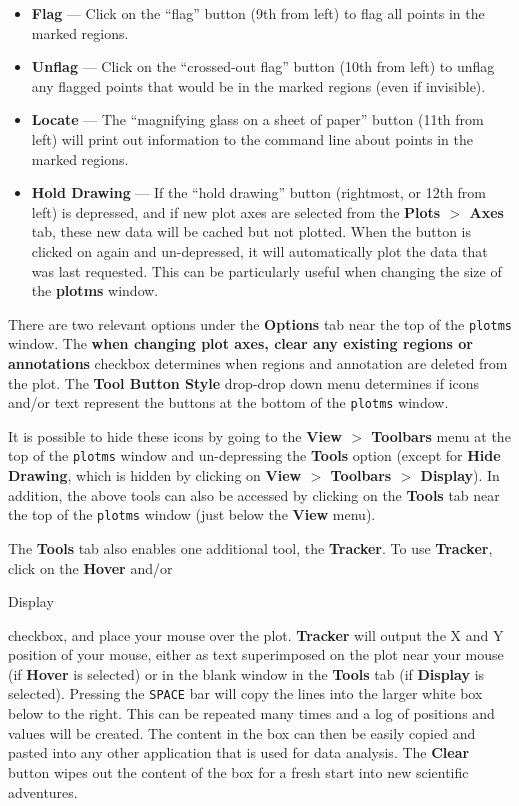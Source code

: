 \begin{itemize}
\item {\bf Flag} --- Click on the ``flag'' button (9th from left) to flag all points in the marked regions.

\item {\bf Unflag} --- Click on the ``crossed-out flag'' button (10th
  from left) to unflag any flagged points that would be in the marked
  regions (even if invisible).

\item {\bf Locate} --- The ``magnifying glass on a sheet of paper''
  button (11th from left) will print out information to the command
  line about points in the marked regions.

\item {\bf Hold Drawing} --- If the ``hold drawing'' button
  (rightmost, or 12th from left) is depressed, and if new plot axes
  are selected from the {\bf Plots $>$ Axes} tab, these new data will
  be cached but not plotted. When the button is clicked on again and
  un-depressed, it will automatically plot the data that was last
  requested. This can be particularly useful when changing the size of
  the {\bf plotms} window.
\end{itemize}

There are two relevant options under the {\bf Options} tab near the
top of the {\tt plotms} window. The {\bf when changing plot axes,
  clear any existing regions or annotations} checkbox determines when
regions and annotation are deleted from the plot. The {\bf Tool Button
  Style} drop-drop down menu determines if icons and/or text represent
the buttons at the bottom of the {\tt plotms} window.

It is possible to hide these icons by going to the {\bf View $>$
  Toolbars} menu at the top of the {\tt plotms} window and
un-depressing the {\bf Tools} option (except for {\bf Hide Drawing},
which is hidden by clicking on {\bf View $>$ Toolbars $>$
  Display}). In addition, the above tools can also be accessed by
clicking on the {\bf Tools} tab near the top of the {\tt plotms}
window (just below the {\bf View} menu).

The {\bf Tools} tab also enables one additional tool, the {\bf
  Tracker}. To use {\bf Tracker}, click on the {\bf Hover} and/or {\bf

  Display} checkbox, and place your mouse over the plot. {\bf Tracker}
will output the X and Y position of your mouse, either as text
superimposed on the plot near your mouse (if {\bf Hover} is selected)
or in the blank window in the {\bf Tools} tab (if {\bf Display} is
selected). Pressing the {\tt SPACE} bar will copy the lines into the
larger white box below to the right. This can be repeated many times
and a log of positions and values will be created. The content in the
box can then be easily copied and pasted into any other application
that is used for data analysis. The {\bf Clear} button wipes out the
content of the box for a fresh start into new scientific adventures.




